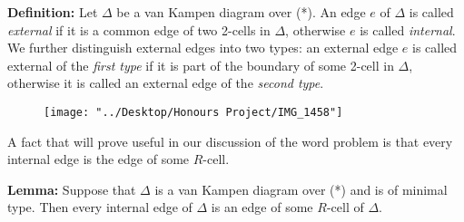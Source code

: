 \documentclass[12pt]{article}
\newcommand{\vs}{\vskip10pt}
\begin{document}
	\textbf{Definition: } Let $\Delta$ be a van Kampen diagram over (*). An edge $e$ of $\Delta$ is called \textit{external} if it is a common edge of two 2-cells in $\Delta$, otherwise $e$ is called \textit{internal}. We further distinguish external edges into two types: an external edge $e$ is called external of the \textit{first type} if it is part of the boundary of some 2-cell in $\Delta$, otherwise it is called an external edge of the \textit{second type}. 
	
	\begin{figure} [h]
		\centering
		\texttt{[image: "../Desktop/Honours Project/IMG\_1458"]}
		\caption{}
		\label{fig:img1458}
	\end{figure}
	
	\vs 
	
	A fact that will prove useful in our discussion of the word problem is that every internal edge is the edge of some $R$-cell. 
	
	\vs 
	
	\textbf{Lemma: } Suppose that $\Delta$ is a van Kampen diagram over (*) and is of minimal type. Then every internal edge of $\Delta$ is an edge of some $R$-cell of $\Delta$. 
	
\end{document}
